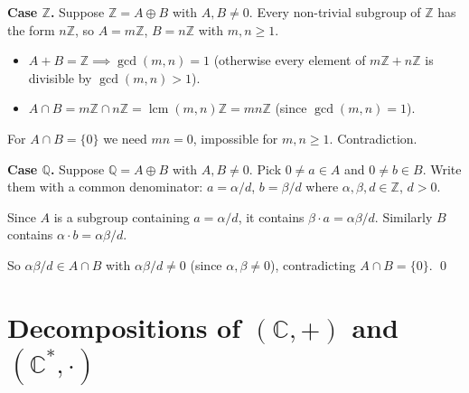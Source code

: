 \documentclass[12pt,a4paper]{article}
\newenvironment{sol}{\begin{mdframed}[style=solstyle]}{\end{mdframed}}
\newcommand{\Z}{\mathbb{Z}}
\newcommand{\Q}{\mathbb{Q}}
\newcommand{\C}{\mathbb{C}}
\newcommand{\Cstar}{\mathbb{C}^{*}}
\DeclareMathOperator{\lcm}{lcm}
\begin{document}
\begin{sol}
\textbf{\color{SectCol}Case $\Z$.}\;
Suppose $\Z = A \oplus B$ with $A, B \neq 0$.
Every non-trivial subgroup of $\Z$ has the form $n\Z$, so $A = m\Z$, $B = n\Z$
with $m, n \geq 1$.

\begin{itemize}[leftmargin=*]
  \item $A + B = \Z \implies \gcd(m,n)=1$\; (otherwise every element of
    $m\Z + n\Z$ is divisible by $\gcd(m,n) > 1$).
  \item $A \cap B = m\Z \cap n\Z = \lcm(m,n)\Z = mn\Z$\; (since $\gcd(m,n)=1$).
\end{itemize}

For $A \cap B = \{0\}$ we need $mn = 0$, impossible for $m,n \geq 1$. Contradiction.

\begin{center}
\end{center}

\textbf{\color{SectCol}Case $\Q$.}\;
Suppose $\Q = A \oplus B$ with $A, B \neq 0$.
Pick $0 \neq a \in A$ and $0 \neq b \in B$.
Write them with a common denominator: $a = \alpha/d$, $b = \beta/d$
where $\alpha, \beta, d \in \Z$, $d > 0$.

Since $A$ is a subgroup containing $a = \alpha/d$, it contains
$\beta \cdot a = \alpha\beta/d$. Similarly $B$ contains
$\alpha \cdot b = \alpha\beta/d$.

So $\alpha\beta/d \in A \cap B$ with $\alpha\beta/d \neq 0$
(since $\alpha, \beta \neq 0$),
contradicting $A \cap B = \{0\}$. \qed
\end{sol}

\bigskip
\section{Decompositions of $(\C,+)$ and $(\Cstar, \cdot)$}
\end{document}
